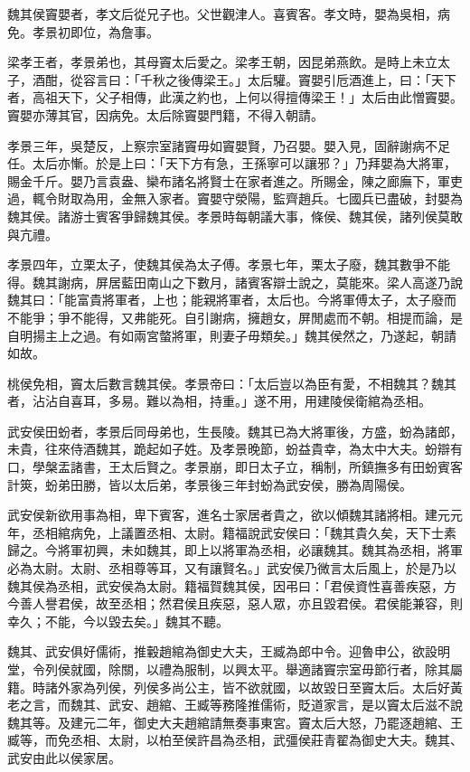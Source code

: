 
\begin{pinyinscope}
魏其侯竇嬰者，孝文后從兄子也。父世觀津人。喜賓客。孝文時，嬰為吳相，病免。孝景初即位，為詹事。

梁孝王者，孝景弟也，其母竇太后愛之。梁孝王朝，因昆弟燕飲。是時上未立太子，酒酣，從容言曰：「千秋之後傳梁王。」太后驩。竇嬰引卮酒進上，曰：「天下者，高祖天下，父子相傳，此漢之約也，上何以得擅傳梁王！」太后由此憎竇嬰。竇嬰亦薄其官，因病免。太后除竇嬰門籍，不得入朝請。

孝景三年，吳楚反，上察宗室諸竇毋如竇嬰賢，乃召嬰。嬰入見，固辭謝病不足任。太后亦慚。於是上曰：「天下方有急，王孫寧可以讓邪？」乃拜嬰為大將軍，賜金千斤。嬰乃言袁盎、欒布諸名將賢士在家者進之。所賜金，陳之廊廡下，軍吏過，輒令財取為用，金無入家者。竇嬰守滎陽，監齊趙兵。七國兵已盡破，封嬰為魏其侯。諸游士賓客爭歸魏其侯。孝景時每朝議大事，條侯、魏其侯，諸列侯莫敢與亢禮。

孝景四年，立栗太子，使魏其侯為太子傅。孝景七年，栗太子廢，魏其數爭不能得。魏其謝病，屏居藍田南山之下數月，諸賓客辯士說之，莫能來。梁人高遂乃說魏其曰：「能富貴將軍者，上也；能親將軍者，太后也。今將軍傅太子，太子廢而不能爭；爭不能得，又弗能死。自引謝病，擁趙女，屏閒處而不朝。相提而論，是自明揚主上之過。有如兩宮螫將軍，則妻子毋類矣。」魏其侯然之，乃遂起，朝請如故。

桃侯免相，竇太后數言魏其侯。孝景帝曰：「太后豈以為臣有愛，不相魏其？魏其者，沾沾自喜耳，多易。難以為相，持重。」遂不用，用建陵侯衛綰為丞相。

武安侯田蚡者，孝景后同母弟也，生長陵。魏其已為大將軍後，方盛，蚡為諸郎，未貴，往來侍酒魏其，跪起如子姓。及孝景晚節，蚡益貴幸，為太中大夫。蚡辯有口，學槃盂諸書，王太后賢之。孝景崩，即日太子立，稱制，所鎮撫多有田蚡賓客計筴，蚡弟田勝，皆以太后弟，孝景後三年封蚡為武安侯，勝為周陽侯。

武安侯新欲用事為相，卑下賓客，進名士家居者貴之，欲以傾魏其諸將相。建元元年，丞相綰病免，上議置丞相、太尉。籍福說武安侯曰：「魏其貴久矣，天下士素歸之。今將軍初興，未如魏其，即上以將軍為丞相，必讓魏其。魏其為丞相，將軍必為太尉。太尉、丞相尊等耳，又有讓賢名。」武安侯乃微言太后風上，於是乃以魏其侯為丞相，武安侯為太尉。籍福賀魏其侯，因弔曰：「君侯資性喜善疾惡，方今善人譽君侯，故至丞相；然君侯且疾惡，惡人眾，亦且毀君侯。君侯能兼容，則幸久；不能，今以毀去矣。」魏其不聽。

魏其、武安俱好儒術，推轂趙綰為御史大夫，王臧為郎中令。迎魯申公，欲設明堂，令列侯就國，除關，以禮為服制，以興太平。舉適諸竇宗室毋節行者，除其屬籍。時諸外家為列侯，列侯多尚公主，皆不欲就國，以故毀日至竇太后。太后好黃老之言，而魏其、武安、趙綰、王臧等務隆推儒術，貶道家言，是以竇太后滋不說魏其等。及建元二年，御史大夫趙綰請無奏事東宮。竇太后大怒，乃罷逐趙綰、王臧等，而免丞相、太尉，以柏至侯許昌為丞相，武彊侯莊青翟為御史大夫。魏其、武安由此以侯家居。


\end{pinyinscope}

